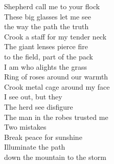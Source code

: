 Shepherd call me to your flock\\
These big glasses let me see\\
the way the path the truth\\
Crook a staff for my tender neck\\

The giant lenses pierce fire\\
to the field, part of the pack\\
I am who alights the grass\\
Ring of roses around our warmth\\

Crook metal cage around my face\\
I see out, but they\\
The herd see disfigure\\
The man in the robes trusted me\\

Two mistakes\\
Break peace for sunshine\\
Illuminate the path\\
down the mountain to the storm\\

